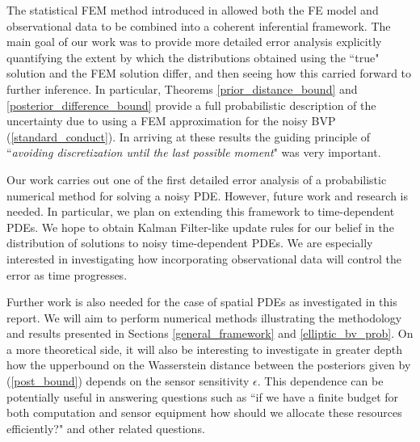 The statistical FEM method introduced in \textcolor{blue}{\cite{girolami2019statistical}} allowed both the FE model and observational data to be combined into a coherent inferential framework. The main goal of our work was to provide more detailed error analysis explicitly quantifying the extent by which the distributions obtained using the ``true" solution and the FEM solution differ, and then seeing how this carried forward to further inference. In particular, Theorems \textcolor{blue}{\ref{prior_distance_bound}} and \textcolor{blue}{\ref{posterior_difference_bound}} provide a full probabilistic description of the uncertainty due to using a FEM approximation for the noisy BVP (\ref{standard_conduct}). In arriving at these results the guiding principle of ``\textit{avoiding discretization until the last possible moment}" \textcolor{blue}{\cite{stuart2010inverse}} was very important.

Our work carries out one of the first detailed error analysis of a probabilistic numerical method for solving a noisy PDE. However, future work and research is needed. In particular, we plan on extending this framework to time-dependent PDEs. We hope to obtain Kalman Filter-like update rules for our belief in the distribution of solutions to noisy time-dependent PDEs. We are especially interested in investigating how incorporating observational data will control the error as time progresses.

Further work is also needed for the case of spatial PDEs as investigated in this report. We will aim to perform numerical methods illustrating the methodology and results presented in Sections \textcolor{blue}{\ref{general_framework}} and \textcolor{blue}{\ref{elliptic_bv_prob}}. On a more theoretical side, it will also be interesting to investigate in greater depth how the upperbound on the Wasserstein distance between the posteriors given by (\ref{post_bound}) depends on the sensor sensitivity $\epsilon$. This dependence can be potentially useful in answering questions such as ``if we have a finite budget for both computation and sensor equipment how should we allocate these resources efficiently?" and other related questions.
